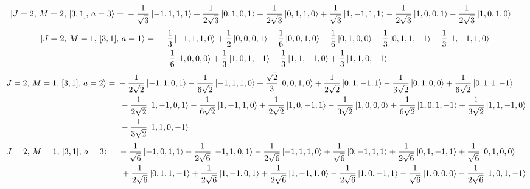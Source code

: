 \documentclass{article}
\begin{document}
\begin{equation*}
\begin{aligned}
\ket{J=2,\,M=2,\,[3,1],\,a=3} = \; &- \frac{1}{\sqrt{3}} \ket{-1,1,1,1} + \frac{1}{2\sqrt{3}} \ket{0,1,0,1} + \frac{1}{2\sqrt{3}} \ket{0,1,1,0} + \frac{1}{\sqrt{3}} \ket{1,-1,1,1} - \frac{1}{2\sqrt{3}} \ket{1,0,0,1} - \frac{1}{2\sqrt{3}} \ket{1,0,1,0}
\end{aligned}
\end{equation*}
{\small
\begin{equation*}
\begin{aligned}
\ket{J=2,\,M=1,\,[3,1],\,a=1} = \; &- \frac{1}{3} \ket{-1,1,1,0} + \frac{1}{2} \ket{0,0,0,1} - \frac{1}{6} \ket{0,0,1,0} - \frac{1}{6} \ket{0,1,0,0} + \frac{1}{3} \ket{0,1,1,-1} - \frac{1}{3} \ket{1,-1,1,0} \\
  & \; - \frac{1}{6} \ket{1,0,0,0} + \frac{1}{3} \ket{1,0,1,-1} - \frac{1}{3} \ket{1,1,-1,0} + \frac{1}{3} \ket{1,1,0,-1}
\end{aligned}
\end{equation*}}
{\small
\begin{equation*}
\begin{aligned}
\ket{J=2,\,M=1,\,[3,1],\,a=2} = \; &- \frac{1}{2\sqrt{2}} \ket{-1,1,0,1} - \frac{1}{6\sqrt{2}} \ket{-1,1,1,0} + \frac{\sqrt{2}}{3} \ket{0,0,1,0} + \frac{1}{2\sqrt{2}} \ket{0,1,-1,1} - \frac{1}{3\sqrt{2}} \ket{0,1,0,0} + \frac{1}{6\sqrt{2}} \ket{0,1,1,-1} \\
  & \; - \frac{1}{2\sqrt{2}} \ket{1,-1,0,1} - \frac{1}{6\sqrt{2}} \ket{1,-1,1,0} + \frac{1}{2\sqrt{2}} \ket{1,0,-1,1} - \frac{1}{3\sqrt{2}} \ket{1,0,0,0} + \frac{1}{6\sqrt{2}} \ket{1,0,1,-1} + \frac{1}{3\sqrt{2}} \ket{1,1,-1,0} \\
  & \; - \frac{1}{3\sqrt{2}} \ket{1,1,0,-1}
\end{aligned}
\end{equation*}}
{\small
\begin{equation*}
\begin{aligned}
\ket{J=2,\,M=1,\,[3,1],\,a=3} = \; &- \frac{1}{\sqrt{6}} \ket{-1,0,1,1} - \frac{1}{2\sqrt{6}} \ket{-1,1,0,1} - \frac{1}{2\sqrt{6}} \ket{-1,1,1,0} + \frac{1}{\sqrt{6}} \ket{0,-1,1,1} + \frac{1}{2\sqrt{6}} \ket{0,1,-1,1} + \frac{1}{\sqrt{6}} \ket{0,1,0,0} \\
  & \; + \frac{1}{2\sqrt{6}} \ket{0,1,1,-1} + \frac{1}{2\sqrt{6}} \ket{1,-1,0,1} + \frac{1}{2\sqrt{6}} \ket{1,-1,1,0} - \frac{1}{2\sqrt{6}} \ket{1,0,-1,1} - \frac{1}{\sqrt{6}} \ket{1,0,0,0} - \frac{1}{2\sqrt{6}} \ket{1,0,1,-1}
\end{aligned}
\end{equation*}}
\end{document}
